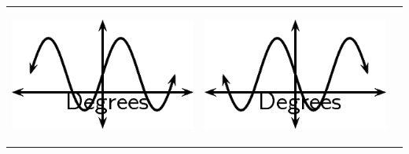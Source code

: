 \begin{center}
\begin{xtabular*}{\mytablewidth}[t]{|p{10\mystarwidth}|p{10\mystarwidth}|p{10\mystarwidth}|}
    
        
                  
    \setcounter{subfigure}{0}

\label{m39414*id85372}
    \begin{center}
    \label{m39414*id85372!!!underscore!!!media}\label{m39414*id85372!!!underscore!!!printimage}\includegraphics{col11306.imgs/m39414_MG10C15_019.png} %
        
      \vspace{2pt}
    \vspace{.1in}
    
    \end{center}



    \addtocounter{footnote}{-0}
    
                 &
    
    
        
                  
    \setcounter{subfigure}{0}

\label{m39414*id85384}
    \begin{center}
    \label{m39414*id85384!!!underscore!!!media}\label{m39414*id85384!!!underscore!!!printimage}\includegraphics{col11306.imgs/m39414_MG10C15_020.png} %
        

\end{center}
\end{xtabular*}
\end{center}
